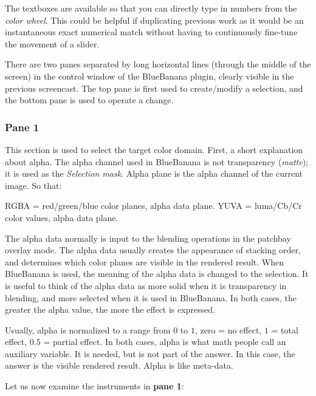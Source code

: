 The textboxes are available so that you can directly type in numbers from the \textit{color wheel}. This could be helpful if duplicating previous work as it would be an instantaneous exact numerical match without having to continuously fine-tune the movement of a slider.

There are two panes separated by long horizontal lines (through the middle of the screen) in the control window of the BlueBanana plugin, clearly visible in the previous screencast. The top pane is first used to create/modify a selection, and the bottom pane is used to operate a change.

\subsubsection*{Pane 1}
\label{ssub:pane1}

This section is used to select the target color domain. First, a short explanation about alpha. The alpha channel used in BlueBanana is not transparency (\textit{matte}); it is used as the \textit{Selection mask}. Alpha plane is the alpha channel of the current image. So that:

RGBA = red/green/blue color planes, alpha data plane. 
YUVA = luma/Cb/Cr color values, alpha data plane.

The alpha data normally is input to the blending operations in the patchbay overlay mode. The alpha data usually creates the appearance of stacking order, and determines which color planes are visible in the rendered result. When BlueBanana is used, the meaning of the alpha data is changed to the selection. It is useful to think of the alpha data as more solid when it is transparency in blending, and more selected when it is used in BlueBanana. In both cases, the greater the alpha value, the more the effect is expressed.

Usually, alpha is normalized to a range from $0$ to $1$, zero = no effect, $1$ = total effect, $0.5$ = partial effect. In both cases, alpha is what math people call an auxiliary variable. It is needed, but is not part of the answer. In this case, the answer is the visible rendered result. Alpha is like meta-data.

Let us now examine the instruments in \textbf{pane 1}:

